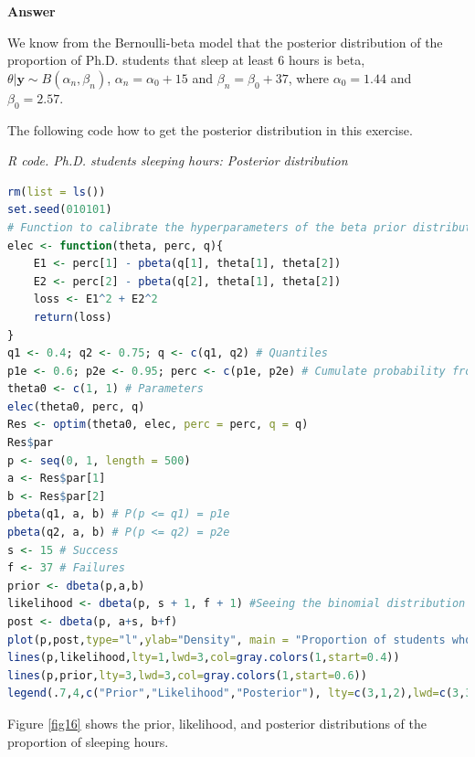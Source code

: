 \begin{enumerate}[leftmargin=*]
\textbf{Answer}

We know from the Bernoulli-beta model that the posterior distribution of the proportion of Ph.D. students that sleep at least 6 hours is beta, $\theta|\bm{y}\sim B(\alpha_n,\beta_n)$, $\alpha_n=\alpha_0+15$ and $\beta_n=\beta_0+37$, where $\alpha_0=1.44$ and $\beta_0=2.57$. 

The following code how to get the posterior distribution in this exercise.
\begin{tcolorbox}[enhanced,width=4.67in,center upper,
	fontupper=\large\bfseries,drop shadow southwest,sharp corners]
	\textit{R code. Ph.D. students sleeping hours: Posterior distribution}
	\begin{VF}
		\begin{lstlisting}[language=R]
rm(list = ls())
set.seed(010101)
# Function to calibrate the hyperparameters of the beta prior distribution
elec <- function(theta, perc, q){
	E1 <- perc[1] - pbeta(q[1], theta[1], theta[2])
	E2 <- perc[2] - pbeta(q[2], theta[1], theta[2])
	loss <- E1^2 + E2^2
	return(loss)
}
q1 <- 0.4; q2 <- 0.75; q <- c(q1, q2) # Quantiles
p1e <- 0.6; p2e <- 0.95; perc <- c(p1e, p2e) # Cumulate probability from experts 
theta0 <- c(1, 1) # Parameters
elec(theta0, perc, q)
Res <- optim(theta0, elec, perc = perc, q = q)
Res$par
p <- seq(0, 1, length = 500)
a <- Res$par[1]
b <- Res$par[2]
pbeta(q1, a, b) # P(p <= q1) = p1e
pbeta(q2, a, b) # P(p <= q2) = p2e
s <- 15 # Success
f <- 37 # Failures
prior <- dbeta(p,a,b)
likelihood <- dbeta(p, s + 1, f + 1) #Seeing the binomial distribution as a likelihood is a beta distribution!!!
post <- dbeta(p, a+s, b+f)
plot(p,post,type="l",ylab="Density", main = "Proportion of students who sleep at least 6 hours per day",lty=2,lwd=3,col=gray.colors(1,start=0.1))
lines(p,likelihood,lty=1,lwd=3,col=gray.colors(1,start=0.4))
lines(p,prior,lty=3,lwd=3,col=gray.colors(1,start=0.6))
legend(.7,4,c("Prior","Likelihood","Posterior"), lty=c(3,1,2),lwd=c(3,3,3),col=c(col=gray.colors(1,start=0.6),col=gray.colors(1,start=0.4),col=gray.colors(1,start=0.1)))
\end{lstlisting}
	\end{VF}
\end{tcolorbox} 

Figure \ref{fig16} shows the prior, likelihood, and posterior distributions of the proportion of sleeping hours.
 

\end{enumerate}
